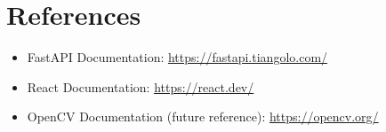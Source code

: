 \documentclass[12pt]{article}
\begin{document}
\section{References}

\begin{itemize}[noitemsep]
    \item FastAPI Documentation: \url{https://fastapi.tiangolo.com/}
    \item React Documentation: \url{https://react.dev/}
    \item OpenCV Documentation (future reference): \url{https://opencv.org/}
\end{itemize}
\end{document}
